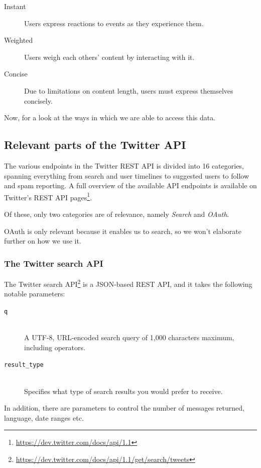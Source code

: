 \begin{description}
  \item[Instant] Users express reactions to events as they experience them.
  \item[Weighted] Users weigh each others' content by interacting with it.
  \item[Concise] Due to limitations on content length, users must express themselves concisely.
\end{description}

Now, for a look at the ways in which we are able to access this data.

\subsection{Relevant parts of the Twitter API} %
\label{sub:relevant_parts_of_the_twitter_api}

The various endpoints in the Twitter REST API is divided into 16 categories, spanning everything from search and user timelines to suggested users to follow and spam reporting. A full overview of the available API endpoints is available on Twitter's REST API pages\footnote{\url{https://dev.twitter.com/docs/api/1.1}}.

Of these, only two categories are of relevance, namely \emph{Search} and \emph{OAuth}.

OAuth is only relevant because it enables us to search, so we won't elaborate further on how we use it.

\subsubsection{The Twitter search API}
\label{ssec:search_api}

The Twitter search API\footnote{\url{https://dev.twitter.com/docs/api/1.1/get/search/tweets}} is a JSON-based REST API, and it takes the following notable parameters:

\begin{description}
  \item[\texttt{q}] \hfill \\
    A UTF-8, URL-encoded search query of 1,000 characters maximum, including operators.
  \item[\texttt{result\_type}] \hfill \\
    Specifies what type of search results you would prefer to receive.
\end{description}

In addition, there are parameters to control the number of messages returned, language, date ranges etc.

